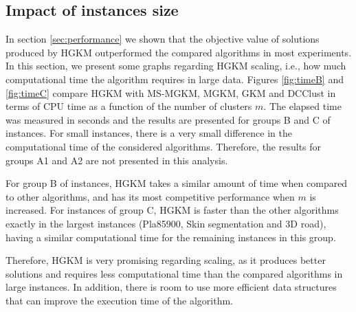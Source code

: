 \subsection{Impact of instances size}
In section \ref{sec:performance} we shown that the objective value of solutions produced by HGKM outperformed the compared algorithms in most experiments. In this section, we present some graphs regarding HGKM scaling, i.e., how much computational time the algorithm requires in large data. Figures \ref{fig:timeB} and \ref{fig:timeC} compare HGKM with MS-MGKM, MGKM, GKM and DCClust in terms of CPU time as a function of the number of clusters $m$. The elapsed time was measured in seconds and the results are presented for groups B and C of instances. For small instances, there is a very small difference in the computational time of the considered algorithms. Therefore, the results for groups A1 and A2 are not presented in this analysis.

For group B of instances, HGKM takes a similar amount of time when compared to other algorithms, and has its most competitive performance when $m$ is increased. For instances of group C, HGKM is faster than the other algorithms exactly in the largest instances (Pla85900, Skin segmentation and 3D road), having a similar computational time for the remaining instances in this group.

Therefore, HGKM is very promising regarding scaling, as it produces better solutions and requires less computational time than the compared algorithms in large instances. In addition, there is room to use more efficient data structures that can improve the execution time of the algorithm.

%

